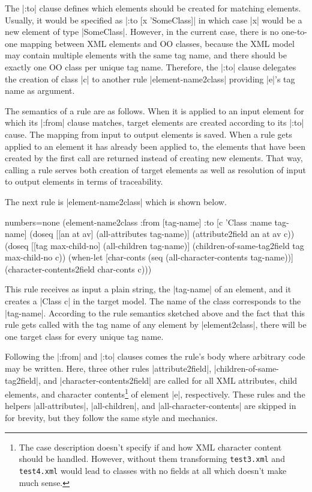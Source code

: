 \documentclass[submission]{eptcs}
\newcommand{\code}{\clojureinline}
\begin{document}
The \code|:to| clause defines which elements should be created for matching
elements.  Usually, it would be specified as \code|:to [x 'SomeClass]| in which
case \code|x| would be a new element of type \code|SomeClass|.  However, in the
current case, there is no one-to-one mapping between XML elements and OO
classes, because the XML model may contain multiple elements with the same tag
name, and there should be exactly one OO class per unique tag name.  Therefore,
the \code|:to| clause delegates the creation of class \code|c| to another rule
\code|element-name2class| providing \code|e|'s tag name as argument.

The semantics of a rule are as follows.  When it is applied to an input element
for which its \code|:from| clause matches, target elements are created
according to its \code|:to| cause.  The mapping from input to output elements
is saved.  When a rule gets applied to an element it has already been applied
to, the elements that have been created by the first call are returned instead
of creating new elements.  That way, calling a rule serves both creation of
target elements as well as resolution of input to output elements in terms of
traceability.

The next rule is \code|element-name2class| which is shown below.

\begin{clojurecode*}{numbers=none}
  (element-name2class
   :from [tag-name]
   :to   [c 'Class {:name tag-name}]
   (doseq [[an at av] (all-attributes tag-name)]
     (attribute2field an at av c))
   (doseq [[tag max-child-no] (all-children tag-name)]
     (children-of-same-tag2field tag max-child-no c))
   (when-let [char-conts (seq (all-character-contents tag-name))]
     (character-contents2field char-conts c)))
\end{clojurecode*}

This rule receives as input a plain string, the \code|tag-name| of an element,
and it creates a \code|Class c| in the target model.  The name of the class
corresponds to the \code|tag-name|.  According to the rule semantics sketched
above and the fact that this rule gets called with the tag name of any element
by \code|element2class|, there will be one target class for every unique tag
name.

Following the \code|:from| and \code|:to| clauses comes the rule's body where
arbitrary code may be written.  Here, three other rules \code|attribute2field|,
\code|children-of-same-tag2field|, and \code|character-contents2field| are
called for all XML attributes, child elements, and character
contents\footnote{The case description doesn't specify if and how XML character
  content should be handled.  However, without them transforming
  \texttt{test3.xml} and \texttt{test4.xml} would lead to classes with no
  fields at all which doesn't make much sense.}  of element \code|e|,
respectively.  These rules and the helpers \code|all-attributes|,
\code|all-children|, and \code|all-character-contents| are skipped in for
brevity, but they follow the same style and mechanics.
\end{document}
